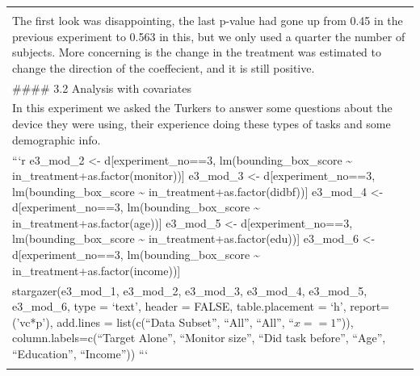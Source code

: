 \documentclass[
]{article}
\begin{document}
\begin{longtable}[]{@{}l@{}}
\begin{minipage}[t]{0.65\columnwidth}
\end{minipage}\tabularnewline
\begin{minipage}[t]{0.65\columnwidth}\raggedright
The first look was disappointing, the last p-value had gone up from 0.45
in the previous experiment to 0.563 in this, but we only used a quarter
the number of subjects. More concerning is the change in the treatment
was estimated to change the direction of the coeffecient, and it is
still positive.\strut
\end{minipage}\tabularnewline
\begin{minipage}[t]{0.65\columnwidth}\raggedright
\#\#\#\# 3.2 Analysis with covariates\strut
\end{minipage}\tabularnewline
\begin{minipage}[t]{0.65\columnwidth}\raggedright
In this experiment we asked the Turkers to answer some questions about
the device they were using, their experience doing these types of tasks
and some demographic info.\strut
\end{minipage}\tabularnewline
\begin{minipage}[t]{0.65\columnwidth}\raggedright
```r e3\_mod\_2 \textless- d{[}experiment\_no==3,
lm(bounding\_box\_score \textasciitilde{}
in\_treatment+as.factor(monitor)){]} e3\_mod\_3 \textless-
d{[}experiment\_no==3, lm(bounding\_box\_score \textasciitilde{}
in\_treatment+as.factor(didbf)){]} e3\_mod\_4 \textless-
d{[}experiment\_no==3, lm(bounding\_box\_score \textasciitilde{}
in\_treatment+as.factor(age)){]} e3\_mod\_5 \textless-
d{[}experiment\_no==3, lm(bounding\_box\_score \textasciitilde{}
in\_treatment+as.factor(edu)){]} e3\_mod\_6 \textless-
d{[}experiment\_no==3, lm(bounding\_box\_score \textasciitilde{}
in\_treatment+as.factor(income)){]}\strut
\end{minipage}\tabularnewline
\begin{minipage}[t]{0.65\columnwidth}\raggedright
stargazer(e3\_mod\_1, e3\_mod\_2, e3\_mod\_3, e3\_mod\_4, e3\_mod\_5,
e3\_mod\_6, type = `text', header = FALSE, table.placement = `h',
report=('vc*p'), add.lines = list(c(``Data Subset'', ``All'', ``All'',
``\(x==1\)'')), column.labels=c(``Target Alone'', ``Monitor size'',
``Did task before'', ``Age'', ``Education'', ``Income'')) ```\strut
\end{minipage}\tabularnewline
\begin{minipage}[t]{0.65\columnwidth}\raggedright

\end{minipage}
\end{longtable}
\end{document}
